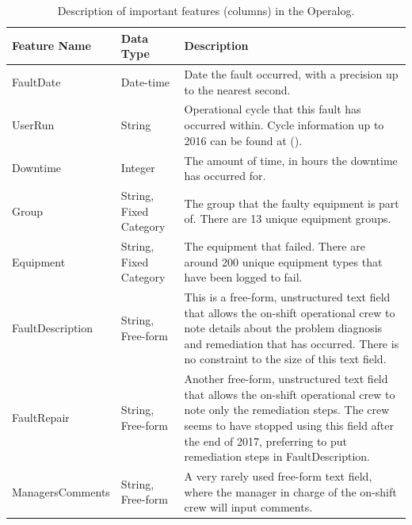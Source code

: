 \documentclass[10pt,oneside]{report}
\begin{document}
\begin{table}[htbp]
    \fontsize{8}{10}\selectfont
    \centering
    \begin{adjustbox}{max width=\textwidth}

    \begin{tabular}{p{3cm} p{4cm} p{10cm}}
        \toprule
        \textbf{Feature Name} & \textbf{Data Type} & \textbf{Description} \\
        \midrule
        FaultDate & Date-time & Date the fault occurred, with a precision up to the nearest second. \\
        UserRun & String & Operational cycle that this fault has occurred within. Cycle information up to 2016 can be found at (\citet{isisbeamoperations2024}). \\
        Downtime & Integer & The amount of time, in hours the downtime has occurred for. \\
        Group & String, Fixed Category & The group that the faulty equipment is part of. There are 13 unique equipment groups. \\
        Equipment & String, Fixed Category & The equipment that failed. There are around 200 unique equipment types that have been logged to fail. \\
        FaultDescription & String, Free-form & This is a free-form, unstructured text field that allows the on-shift operational crew to note details about the problem diagnosis and remediation that has occurred. There is no constraint to the size of this text field.\\
        FaultRepair & String, Free-form & Another free-form, unstructured text field that allows the on-shift operational crew to note only the remediation steps. The crew seems to have stopped using this field after the end of 2017, preferring to put remediation steps in FaultDescription. \\
        ManagersComments & String, Free-form & A very rarely used free-form text field, where the manager in charge of the on-shift crew will input comments. \\
        \bottomrule
    \end{tabular}
    \end{adjustbox}
    \caption{\fontsize{9}{10}\selectfont Description of important features (columns) in the Operalog.}
    \label{tab:operalog}
\end{table}
\end{document}
